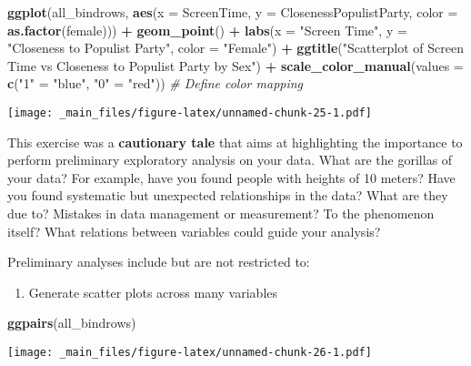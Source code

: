 \documentclass[
]{book}
\newenvironment{Shaded}{\begin{snugshade}}{\end{snugshade}}
\newcommand{\AttributeTok}[1]{\textcolor[rgb]{0.13,0.29,0.53}{#1}}
\newcommand{\CommentTok}[1]{\textcolor[rgb]{0.56,0.35,0.01}{\textit{#1}}}
\newcommand{\FunctionTok}[1]{\textcolor[rgb]{0.13,0.29,0.53}{\textbf{#1}}}
\newcommand{\NormalTok}[1]{#1}
\newcommand{\OtherTok}[1]{\textcolor[rgb]{0.56,0.35,0.01}{#1}}
\newcommand{\SpecialCharTok}[1]{\textcolor[rgb]{0.81,0.36,0.00}{\textbf{#1}}}
\newcommand{\StringTok}[1]{\textcolor[rgb]{0.31,0.60,0.02}{#1}}
\providecommand{\tightlist}{%
  \setlength{\itemsep}{0pt}\setlength{\parskip}{0pt}}
\begin{document}
\begin{Shaded}
\begin{Highlighting}[]
\FunctionTok{ggplot}\NormalTok{(all\_bindrows, }\FunctionTok{aes}\NormalTok{(}\AttributeTok{x =}\NormalTok{ ScreenTime, }\AttributeTok{y =}\NormalTok{ ClosenessPopulistParty, }\AttributeTok{color =} \FunctionTok{as.factor}\NormalTok{(female))) }\SpecialCharTok{+}
  \FunctionTok{geom\_point}\NormalTok{() }\SpecialCharTok{+}
  \FunctionTok{labs}\NormalTok{(}\AttributeTok{x =} \StringTok{"Screen Time"}\NormalTok{, }\AttributeTok{y =} \StringTok{"Closeness to Populist Party"}\NormalTok{, }\AttributeTok{color =} \StringTok{"Female"}\NormalTok{) }\SpecialCharTok{+}
  \FunctionTok{ggtitle}\NormalTok{(}\StringTok{"Scatterplot of Screen Time vs Closeness to Populist Party by Sex"}\NormalTok{) }\SpecialCharTok{+}
  \FunctionTok{scale\_color\_manual}\NormalTok{(}\AttributeTok{values =} \FunctionTok{c}\NormalTok{(}\StringTok{"1"} \OtherTok{=} \StringTok{"blue"}\NormalTok{, }\StringTok{"0"} \OtherTok{=} \StringTok{"red"}\NormalTok{))  }\CommentTok{\# Define color mapping}
\end{Highlighting}
\end{Shaded}

\texttt{[image: \_main\_files/figure-latex/unnamed-chunk-25-1.pdf]}

This exercise was a \textbf{cautionary tale} that aims at highlighting the importance to perform preliminary exploratory analysis on your data. What are the gorillas of your data? For example, have you found people with heights of 10 meters? Have you found systematic but unexpected relationships in the data? What are they due to? Mistakes in data management or measurement? To the phenomenon itself? What relations between variables could guide your analysis?

Preliminary analyses include but are not restricted to:

\begin{enumerate}
\def\labelenumi{\roman{enumi}.}
\tightlist
\item
  Generate scatter plots across many variables
\end{enumerate}

\begin{Shaded}
\begin{Highlighting}[]
\FunctionTok{ggpairs}\NormalTok{(all\_bindrows)}
\end{Highlighting}
\end{Shaded}

\texttt{[image: \_main\_files/figure-latex/unnamed-chunk-26-1.pdf]}
\end{document}
